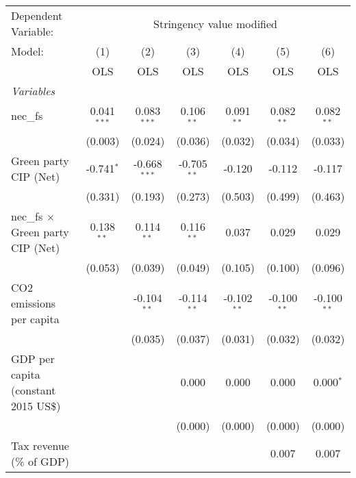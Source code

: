 
\begingroup
\centering
\begin{tabular}{lcccccc}
   \toprule
   Dependent Variable: & \multicolumn{6}{c}{Stringency value modified}\\
   Model:                                   & (1)           & (2)            & (3)           & (4)           & (5)           & (6)\\  
                                            &  OLS          & OLS            & OLS           & OLS           & OLS           & OLS\\  
   \midrule
   \emph{Variables}\\
   nec\_fs                                  & 0.041$^{***}$ & 0.083$^{***}$  & 0.106$^{**}$  & 0.091$^{**}$  & 0.082$^{**}$  & 0.082$^{**}$\\   
                                            & (0.003)       & (0.024)        & (0.036)       & (0.032)       & (0.034)       & (0.033)\\   
   Green party CIP (Net)                    & -0.741$^{*}$  & -0.668$^{***}$ & -0.705$^{**}$ & -0.120        & -0.112        & -0.117\\   
                                            & (0.331)       & (0.193)        & (0.273)       & (0.503)       & (0.499)       & (0.463)\\   
   nec\_fs $\times$ Green party CIP (Net)   & 0.138$^{**}$  & 0.114$^{**}$   & 0.116$^{**}$  & 0.037         & 0.029         & 0.029\\   
                                            & (0.053)       & (0.039)        & (0.049)       & (0.105)       & (0.100)       & (0.096)\\   
   CO2 emissions per capita                 &               & -0.104$^{**}$  & -0.114$^{**}$ & -0.102$^{**}$ & -0.100$^{**}$ & -0.100$^{**}$\\   
                                            &               & (0.035)        & (0.037)       & (0.031)       & (0.032)       & (0.032)\\   
   GDP per capita (constant 2015 US\$)      &               &                & 0.000         & 0.000         & 0.000         & 0.000$^{*}$\\   
                                            &               &                & (0.000)       & (0.000)       & (0.000)       & (0.000)\\   
   Tax revenue (\% of GDP)                  &               &                &               &               & 0.007         & 0.007\\   

\end{tabular}
